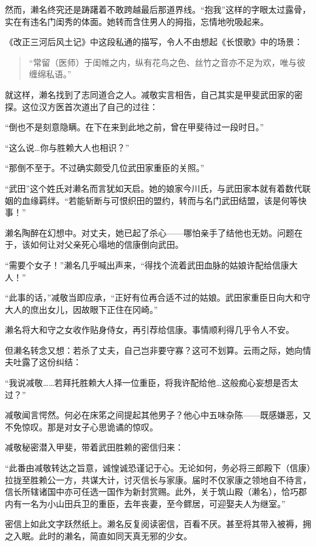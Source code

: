 \documentclass[
]{article}
\begin{document}
然而，濑名终究还是踌躇着不敢跨越最后那道界线。``抱我''这样的字眼太过露骨，实在有违名门闺秀的体面。她转而含住男人的拇指，忘情地吮吸起来。

《改正三河后风土记》中这段私通的描写，令人不由想起《长恨歌》中的场景：

\begin{quote}
``常留（医师）于闺帷之内，纵有花鸟之色、丝竹之音亦不足为欢，唯与彼缠绵私语。''
\end{quote}

就这样，濑名找到了志同道合之人。减敬实言相告，自己其实是甲斐武田家的密探。这位汉方医首次道出了自己的过往：

``倒也不是刻意隐瞒。在下在来到此地之前，曾在甲斐待过一段时日。''

``这么说\ldots 你与胜赖大人也相识？''

``那倒不至于。不过确实颇受几位武田家重臣的关照。''

``武田''这个姓氏对濑名而言犹如天启。她的娘家今川氏，与武田家本就有着数代联姻的血缘羁绊。``若能斩断与可恨织田的盟约，转而与名门武田结盟，该是何等快事！''

濑名陶醉在幻想中。对丈夫，她已起了杀心------哪怕亲手了结他也无妨。问题在于，该如何让对父亲死心塌地的信康倒向武田。

``需要个女子！''濑名几乎喊出声来，``得找个流着武田血脉的姑娘许配给信康大人！''

``此事的话，''减敬当即应承，``正好有位再合适不过的姑娘。武田家重臣日向大和守大人的庶出女儿，因故眼下正住在冈崎。''

濑名将大和守之女收作贴身侍女，再引荐给信康。事情顺利得几乎令人不安。

但濑名转念又想：若杀了丈夫，自己岂非要守寡？这可不划算。云雨之际，她向情夫吐露了这份纠结：

``我说减敬\ldots\ldots 若拜托胜赖大人择一位重臣，将我许配给他\ldots 这般痴心妄想是否太过？''

减敬闻言愕然。何必在床笫之间提起其他男子？他心中五味杂陈------既感嫌恶，又不免惊叹。那是对女子心思诡谲的惊叹。

减敬秘密潜入甲斐，带着武田胜赖的密信归来：

``此番由减敬转达之旨意，诚惶诚恐谨记于心。无论如何，务必将三郎殿下（信康）拉拢至胜赖公一方，共谋大计，讨灭信长与家康。届时不仅家康之领地自不待言，信长所辖诸国中亦可任选一国作为新封赏赐。此外，关于筑山殿（濑名），恰巧郡内有一名为小山田兵卫的重臣，去年丧妻，至今鳏居，可迎娶夫人为继室。''

密信上如此文字跃然纸上。濑名反复阅读密信，百看不厌。甚至将其带入被褥，拥之入眠。此时的濑名，简直如同天真无邪的少女。
\end{document}
